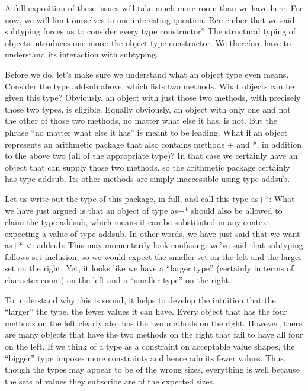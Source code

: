 A full exposition of these issues will take much more room than we have here.
For now, we will limit ourselves to one interesting question. Remember that we
said subtyping forces us to consider every type constructor? The structural
typing of objects introduces one more: the object type constructor. We therefore
have to understand its interaction with subtyping.

Before we do, let’s make sure we understand what an object type even means.
Consider the type addsub above, which lists two methods. What objects can be
given this type? Obviously, an object with just those two methods, with
precisely those two types, is eligible. Equally obviously, an object with only
one and not the other of those two methods, no matter what else it has, is not.
But the phrase “no matter what else it has” is meant to be leading. What if an
object represents an arithmetic package that also contains methods + and *, in
addition to the above two (all of the appropriate type)? In that case we
certainly have an object that can supply those two methods, so the arithmetic
package certainly has type addsub. Its other methods are simply inaccessible
using type addsub.

Let us write out the type of this package, in full, and call this type as+*:
What we have just argued is that an object of type as+* should also be allowed
to claim the type addsub, which means it can be substituted in any context
expecting a value of type addsub. In other words, we have just said that we want
as+* <: addsub:
This may momentarily look confusing: we’ve said that subtyping follows set
inclusion, so we would expect the smaller set on the left and the larger set on
the right. Yet, it looks like we have a “larger type” (certainly in terms of
character count) on the left and a “smaller type” on the right.

To understand why this is sound, it helps to develop the intuition that the
“larger” the type, the fewer values it can have. Every object that has the four
methods on the left clearly also has the two methods on the right. However,
there are many objects that have the two methods on the right that fail to have
all four on the left. If we think of a type as a constraint on acceptable value
shapes, the “bigger” type imposes more constraints and hence admits fewer
values. Thus, though the types may appear to be of the wrong sizes, everything
is well because the sets of values they subscribe are of the expected sizes.

